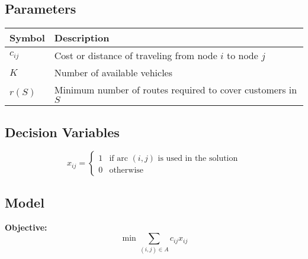 \bigskip

\subsection*{Parameters}

\begin{table}[h]
    \begin{tabular}{ll}
        \toprule
        Symbol   & Description                                                 \\
        \midrule
        $c_{ij}$ & Cost or distance of traveling from node $i$ to node $j$     \\
        $K$      & Number of available vehicles                                \\
        $r(S)$   & Minimum number of routes required to cover customers in $S$ \\
        \bottomrule
    \end{tabular}
\end{table}

\bigskip

\subsection*{Decision Variables}
\begin{equation}
    x_{ij} =
    \begin{cases}
        1 & \text{if arc } (i,j) \text{ is used in the solution} \\
        0 & \text{otherwise}
    \end{cases}
\end{equation}

\bigskip

\subsection*{Model}
\textbf{Objective:}
\begin{equation}
    \label{eq:objective}
    \min \sum_{(i,j)\in A} c_{ij}x_{ij}
\end{equation}

